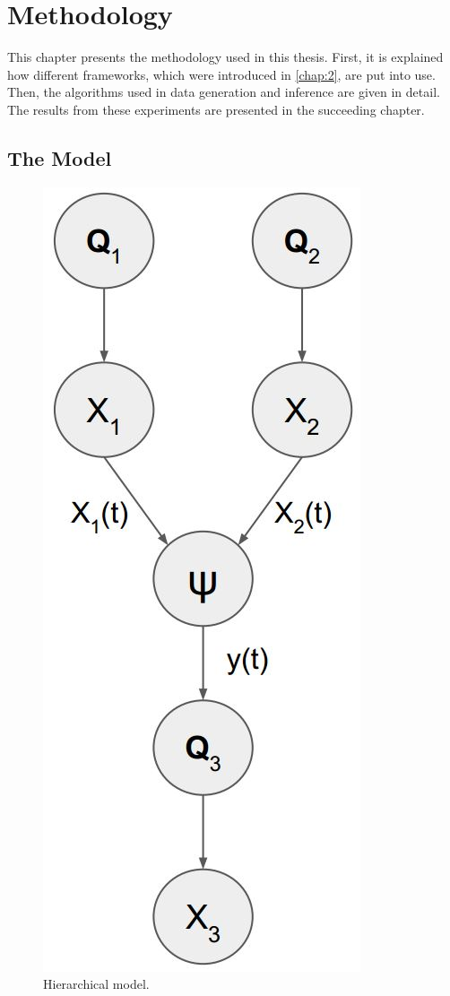 %
\chapter{Methodology}
\label{chap:3}

This chapter presents the methodology used in this thesis. First, it is explained how different frameworks, which were introduced in \cref{chap:2}, are put into use. Then, the algorithms used in data generation and inference are given in detail. The results from these experiments are presented in the succeeding chapter.

\section{The Model}
\begin{figure}
	\centering
	\includegraphics[width=0.6\linewidth]{figures/h_model}
	\caption{Hierarchical model.}
	\label{fig:h_model}
\end{figure} 
